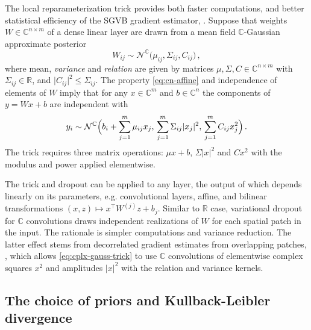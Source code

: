 \documentclass[a4paper,10pt]{article}
\newcommand{\real}{\mathbb{R}}
\newcommand{\cplx}{\mathbb{C}}
\begin{document}
The local reparameterization trick provides both faster computations, and better statistical
efficiency of the SGVB gradient estimator, \citep{wang_fast_2013,kingma_variational_2015}.
Suppose that weights $W \in \cplx^{n\times m}$ of a dense linear layer are drawn from a
mean field $\cplx$-Gaussian approximate posterior
\begin{equation}  \label{eq:c-gauss-vi-general}
  W_{ij}
    \sim \mathcal{N}^{\cplx} \bigl(
      \mu_{ij}, \Sigma_{ij}, C_{ij}
    \bigr)
  \,,
\end{equation}
where mean, \textit{variance} and \textit{relation} are given by matrices $
  \mu, \Sigma, C \in \cplx^{n\times m}
$ with $\Sigma_{ij} \in \real$, and $
  \lvert C_{ij} \rvert^2 \leq \Sigma_{ij}
$. The property \eqref{eq:cn-affine} and independence of elements of $W$ imply that for any
$x \in \cplx^m$ and $b \in \cplx^n$ the components of $y = W x + b$ are independent with
\begin{equation}  \label{eq:cplx-gauss-trick}
  y_i
    \sim \mathcal{N}^{\cplx}
      \Bigl(
        b_i + \sum_{j=1}^m \mu_{ij} x_j,
        \, \sum_{j=1}^m \Sigma_{ij} \lvert x_j \rvert^2,
        \, \sum_{j=1}^m C_{ij} x_j^2
      \Bigr)
    \,.
\end{equation}
The trick requires three matrix operations: $\mu x + b$, $\Sigma \lvert x \rvert^2$ and
$C x^2$ with the modulus and power applied elementwise.

The trick and dropout can be applied to any layer, the output of which depends linearly
on its parameters, e.g. convolutional layers, affine, and bilinear transformations $
  (x, z) \mapsto x^\top W^{(j)} z + b_j
$. Similar to $\real$ case, variational dropout for $\cplx$ convolutions draws independent
realizations of $W$ for each spatial patch in the input. The rationale is simpler computations
and variance reduction. The latter effect stems from decorrelated gradient estimates from
overlapping patches, \citep{kingma_variational_2015}, which allows \eqref{eq:cplx-gauss-trick}
to use $\cplx$ convolutions of elementwise complex squares $x^2$ and amplitudes $\lvert x \rvert^2$
with the relation and variance kernels.


\subsection{The choice of priors and Kullback-Leibler divergence} %
\label{sub:priors_and_kullback_leibler_divergence}
\end{document}
